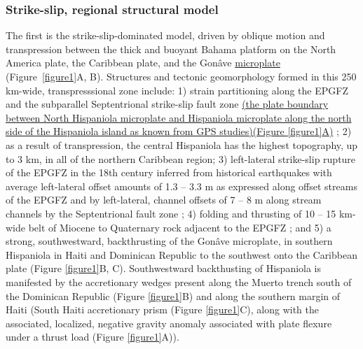 \documentclass[linenumbers,draft]{agujournal}
\begin{document}
\subsubsection{Strike-slip, regional structural model}
The first is the strike-slip-dominated model, driven by oblique motion and transpression between the thick and buoyant Bahama platform on the North America plate, the Caribbean plate, and the Gon\^ave \ul{microplate} \citep{mann1995actively,dolan1998active,mann2002oblique,calais2002strain,calais2016plate} (Figure~\ref{figure1}A, B). Structures and tectonic geomorphology formed in this 250 km-wide, transpresssional zone include: 1) strain partitioning along the EPGFZ and the subparallel Septentrional strike-slip fault zone \ul{(the plate boundary between North Hispaniola microplate and Hispaniola microplate along the north side of the Hispaniola island as known from GPS studies)(Figure {\ref{figure1}}A)} \citep{calais2002strain,calais2010transpressional,hayes2010complex,symithe2013coseismic,douilly2013crustal,douilly2015three}; 2) as a result of transpression, the central Hispaniola has the highest topography, up to 3 km, in all of the northern Caribbean region; 3) left-lateral strike-slip rupture of the EPGFZ in the 18th century inferred from historical earthquakes \citep{bakun2012significant} with average left-lateral offset amounts of 1.3 -- 3.3 m as expressed along offset streams of the EPGFZ \citep{prentice2010seismic} and by left-lateral, channel offsets of 7 -- 8 m along stream channels by the Septentrional fault zone \citep{prentice1993paleoseismicity}; 4) folding and thrusting of 10 -- 15 km-wide belt of Miocene to Quaternary rock adjacent to the EPGFZ \citep{saint2015seismotectonics}; and 5) a strong, southwestward, backthrusting of the Gon\^ave microplate, in southern Hispaniola in Haiti and Dominican Republic to the southwest onto the Caribbean plate \citep{mann2002oblique,grindlay2005high,kroehler2011late} (Figure \ref{figure1}B, C). Southwestward backthusting of Hispaniola is manifested by the accretionary wedges present along the Muerto trench south of the Dominican Republic \citep{bien1986contribution,bruna2009morphotectonics} (Figure \ref{figure1}B) and along the southern margin of Haiti (South Haiti accretionary prism \citep{bien1986contribution} (Figure \ref{figure1}C), along with the associated, localized, negative gravity anomaly associated with plate flexure under a thrust load \citep{mann2002oblique,bruna2009morphotectonics} (Figure \ref{figure1}A)).
\end{document}
